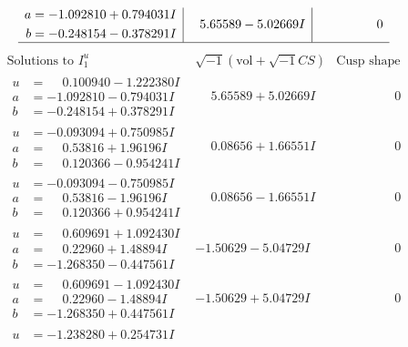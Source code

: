 \documentclass[1p]{elsarticle_modified}
\theoremstyle{definition}
\newcommand{\I}{\sqrt{-1}}
\begin{document}
$$\begin{array}{c|c|c}
\begin{aligned}
a &= -1.092810 + 0.794031 I \\
b &= -0.248154 - 0.378291 I\end{aligned}
 & \phantom{-}5.65589 - 5.02669 I & \phantom{-0.000000 } 0\\
 \hline 
 \end{array}$$\newpage$$\begin{array}{c|c|c}  
\text{Solutions to }I^u_{1}& \I (\text{vol} + \sqrt{-1}CS) & \text{Cusp shape}\\
 \hline 
\begin{aligned}
u &= \phantom{-}0.100940 - 1.222380 I \\
a &= -1.092810 - 0.794031 I \\
b &= -0.248154 + 0.378291 I\end{aligned}
 & \phantom{-}5.65589 + 5.02669 I & \phantom{-0.000000 } 0 \\ \hline\begin{aligned}
u &= -0.093094 + 0.750985 I \\
a &= \phantom{-}0.53816 + 1.96196 I \\
b &= \phantom{-}0.120366 - 0.954241 I\end{aligned}
 & \phantom{-}0.08656 + 1.66551 I & \phantom{-0.000000 } 0 \\ \hline\begin{aligned}
u &= -0.093094 - 0.750985 I \\
a &= \phantom{-}0.53816 - 1.96196 I \\
b &= \phantom{-}0.120366 + 0.954241 I\end{aligned}
 & \phantom{-}0.08656 - 1.66551 I & \phantom{-0.000000 } 0 \\ \hline\begin{aligned}
u &= \phantom{-}0.609691 + 1.092430 I \\
a &= \phantom{-}0.22960 + 1.48894 I \\
b &= -1.268350 - 0.447561 I\end{aligned}
 & -1.50629 - 5.04729 I & \phantom{-0.000000 } 0 \\ \hline\begin{aligned}
u &= \phantom{-}0.609691 - 1.092430 I \\
a &= \phantom{-}0.22960 - 1.48894 I \\
b &= -1.268350 + 0.447561 I\end{aligned}
 & -1.50629 + 5.04729 I & \phantom{-0.000000 } 0 \\ \hline\begin{aligned}
u &= -1.238280 + 0.254731 I \\

\end{aligned}
\end{array}$$
\end{document}
